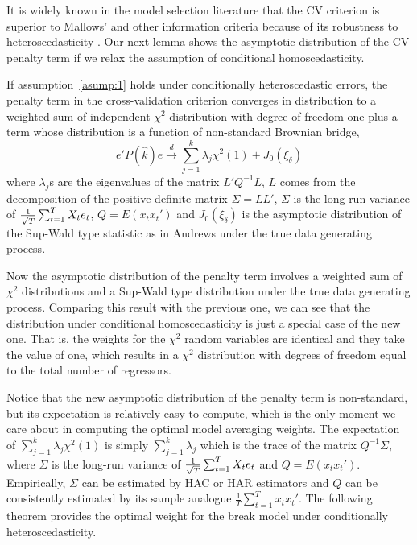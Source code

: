 It is widely known in the model selection literature that the CV criterion is superior to Mallows' and other information criteria because of its robustness to heteroscedasticity \cite{andrews_JE1991}. Our next lemma shows the asymptotic distribution of the CV penalty term if we relax the assumption of conditional homoscedasticity.
\begin{lemma} \label{thm:2}
If assumption~\ref{asump:1} holds under conditionally heteroscedastic errors, the penalty term in the cross-validation criterion converges in distribution to a weighted sum of independent $\chi^2$ distribution with degree of freedom one plus a term whose distribution is a function of non-standard Brownian bridge,
\begin{equation} \label{eq:4}
	e'P(\hat{k})e \stackrel{d}{\rightarrow} \sum_{j=1}^{k} \lambda_j \chi^2(1) + J_0(\xi_{\delta})
\end{equation}
where $\lambda_j$s are the eigenvalues of the matrix $L'Q^{-1}L$, $L$ comes from the decomposition of the positive definite matrix $\Sigma = LL'$, $\Sigma$ is the long-run variance of $\frac{1}{\sqrt{T}}\sum_{t=1}^{T} X_t e_t$, $Q = E(x_t x_t')$ and $J_0(\xi_{\delta})$ is the asymptotic distribution of the Sup-Wald type statistic as in Andrews \cite{andrews93} under the true data generating process.
\end{lemma}
Now the asymptotic distribution of the penalty term involves a weighted sum of $\chi^2$ distributions and a Sup-Wald type distribution under the true data generating process. Comparing this result with the previous one, we can see that the distribution under conditional homoscedasticity is just a special case of the new one. That is, the weights for the $\chi^2$ random variables are identical and they take the value of one, which results in a $\chi^2$ distribution with degrees of freedom equal to the total number of regressors. 

Notice that the new asymptotic distribution of the penalty term is non-standard, but its expectation is relatively easy to compute, which is the only moment we care about in computing the optimal model averaging weights. The expectation of $\sum_{j=1}^{k} \lambda_j \chi^2(1)$ is simply $\sum_{j=1}^{k} \lambda_j$ which is the trace of the matrix $Q^{-1} \Sigma$, where $\Sigma$ is the long-run variance of $\frac{1}{\sqrt{T}}\sum_{t=1}^{T} X_t e_t$ and $Q = E(x_t x_t')$. Empirically, $\Sigma$ can be estimated by HAC or HAR estimators and $Q$ can be consistently estimated by its sample analogue $\frac{1}{T}\sum_{t=1}^{T}x_t x_t'$. The following theorem provides the optimal weight for the break model under conditionally heteroscedasticity.


